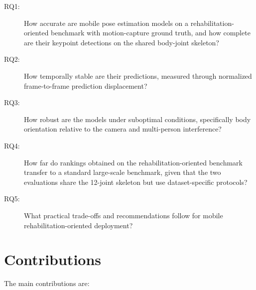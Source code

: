 \begin{description}
  \item[RQ1:] How accurate are mobile pose estimation models on a rehabilitation-oriented benchmark with motion-capture ground truth, and how complete are their keypoint detections on the shared body-joint skeleton?
  \item[RQ2:] How temporally stable are their predictions, measured through normalized frame-to-frame prediction displacement?
  \item[RQ3:] How robust are the models under suboptimal conditions, specifically body orientation relative to the camera and multi-person interference?
  \item[RQ4:] How far do rankings obtained on the rehabilitation-oriented benchmark transfer to a standard large-scale benchmark, given that the two evaluations share the 12-joint skeleton but use dataset-specific protocols?
  \item[RQ5:] What practical trade-offs and recommendations follow for mobile rehabilitation-oriented deployment?
\end{description}


\section{Contributions}
\label{sec:contributions}

The main contributions are:

